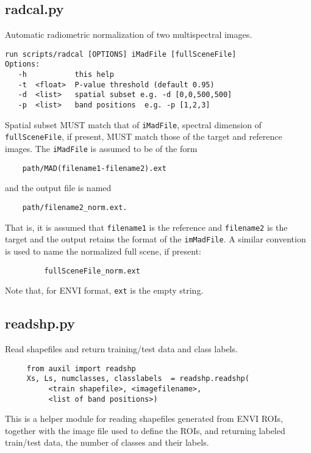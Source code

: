 \documentclass{paper}
\begin{document}
\subsection*{radcal.py}
Automatic radiometric normalization of two multispectral images.
\begin{verbatim}
run scripts/radcal [OPTIONS] iMadFile [fullSceneFile]
Options:
   -h           this help
   -t  <float>  P-value threshold (default 0.95)
   -d  <list>   spatial subset e.g. -d [0,0,500,500]
   -p  <list>   band positions  e.g. -p [1,2,3]
\end{verbatim}
Spatial subset MUST match that of {\tt iMadFile},
spectral dimension of {\tt full\-SceneFile}, if present,
MUST match those of the target and reference images.
The {\tt iMadFile} is assumed to be of the form
\begin{lstlisting}
    path/MAD(filename1-filename2).ext
\end{lstlisting}
and the output file is named
\begin{lstlisting}
    path/filename2_norm.ext.
\end{lstlisting}
That is, it is assumed that {\tt filename1} is the reference and
{\tt filename2} is the target and the output retains the format of the {\tt imMadFile}. A similar convention is used to name the normalized full scene, if present:
\begin{lstlisting}
         fullSceneFile_norm.ext
\end{lstlisting}
Note that, for ENVI format, {\tt ext} is the empty string.



\subsection*{readshp.py}


Read shapefiles and return training/test data and class labels.
\begin{verbatim}
     from auxil import readshp
     Xs, Ls, numclasses, classlabels  = readshp.readshp(
          <train shapefile>, <imagefilename>,
          <list of band positions>)
\end{verbatim}
This is a helper module for reading shapefiles generated from ENVI ROIs, together with the image file used to define the ROIs, and returning labeled train/test data, the number of classes and their labels.
\end{document}
